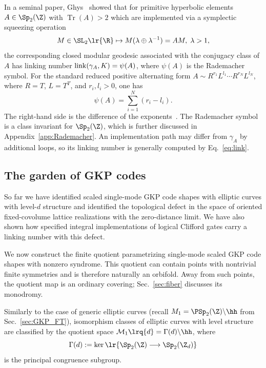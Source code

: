 \documentclass[a4paper, aps, pra, 11pt, onecolumn, tightenlines, superscriptaddress]{revtex4-2}
\begin{document}
In a seminal paper, Ghys~\cite[Sec.~3.3]{Ghys} showed that for primitive hyperbolic elements $A\in\Sp_2(\Z)$ with $\operatorname{Tr}(A)>2$ which are implemented via a symplectic squeezing operation
\begin{equation}
    M\in \SL_2\lr{\R} \mapsto M (\lambda \oplus \lambda^{-1}) = AM,\; \lambda>1,
\end{equation}
the corresponding closed modular geodesic associated with the conjugacy class of $A$ has linking number ${\rm link}(\gamma_A,K)=\psi(A)$, where $\psi(A)$ is the Rademacher symbol. For the standard reduced positive alternating form $A\sim R^{r_1}L^{l_1}\cdots R^{r_N}L^{l_N}$, where $R=T$, $L=T^T$, and $r_i,l_i>0$, one has
\begin{equation}
\psi(A)=\sum_{i=1}^N(r_i-l_i).\label{eq:RL}
\end{equation}
The right-hand side is the difference of the exponents~\cite[Sec.~3.5]{Ghys}. The Rademacher symbol is a class invariant for $\Sp_2(\Z)$, which is further discussed in Appendix~\ref{app:Rademacher}. An implementation path may differ from $\gamma_A$ by additional loops, so its linking number is generally computed by Eq.~\eqref{eq:link}.

\subsection{The garden of GKP codes}
So far we have identified scaled single-mode GKP code shapes with elliptic curves with level-$d$ structure and identified the topological defect in the space of oriented fixed-covolume lattice realizations with the zero-distance limit. We have also shown how specified integral implementations of logical Clifford gates carry a linking number with this defect.

We now construct the finite quotient parametrizing single-mode scaled GKP code shapes with nonzero syndrome. This quotient can contain points with nontrivial finite symmetries and is therefore naturally an orbifold. Away from such points, the quotient map is an ordinary covering; Sec.~\ref{sec:fiber} discusses its monodromy.

Similarly to the case of generic elliptic curves (recall $M_1=\PSp_2(\Z)\backslash\hh$ from Sec.~\ref{sec:GKP_FT}), isomorphism classes of elliptic curves with level structure are classified by the quotient space $\mathcal{M}_1\lrq{d}=\Gamma(d)\backslash\hh$, where
\begin{equation}
\Gamma(d):=\ker\lr{\Sp_2(\Z)\longrightarrow\Sp_2(\Z_d)}
\end{equation}
is the principal congruence subgroup.
\end{document}
